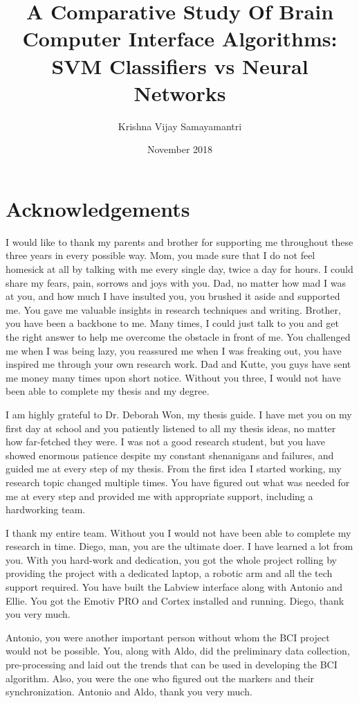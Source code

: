 \documentclass{article}
\title{A Comparative Study Of Brain Computer Interface Algorithms: SVM Classifiers vs Neural Networks}
\author{Krishna Vijay Samayamantri}
\date{November 2018}
\begin{document}
\maketitle

\section{Acknowledgements}
I would like to thank my parents and brother for supporting me throughout these three years in every possible way. Mom, you made sure that I do not feel homesick at all by talking with me every single day, twice a day for hours. I could share my fears, pain, sorrows and joys with you. Dad, no matter how mad I was at you, and how much I have insulted you, you brushed it aside and supported me. You gave me valuable insights in research techniques and writing. Brother, you have been a backbone to me. Many times, I could just talk to you and get the right answer to help me overcome the obstacle in front of me. You challenged me when I was being lazy, you reassured me when I was freaking out, you have inspired me through your own research work. Dad and Kutte, you guys have sent me money many times upon short notice. Without you three, I would not have been able to complete my thesis and my degree.

I am highly grateful to Dr. Deborah Won, my thesis guide. I have met you on my first day at school and you patiently listened to all my thesis ideas, no matter how far-fetched they were. I was not a good research student, but you have showed enormous patience despite my constant shenanigans and failures, and guided me at every step of my thesis. From the first idea I started working, my research topic changed multiple times. You have figured out what was needed for me at every step and provided me with appropriate support, including a hardworking team.

I thank my entire team. Without you I would not have been able to complete my research in time. Diego, man, you are the ultimate doer. I have learned a lot from you. With you hard-work and dedication, you got the whole project rolling by providing the project with a dedicated laptop, a robotic arm and all the tech support required. You have built the Labview interface along with Antonio and Ellie. You got the Emotiv PRO and Cortex installed and running. Diego, thank you very much. 

Antonio, you were another important person without whom the BCI project would not be possible. You, along with Aldo, did the preliminary data collection, pre-processing and laid out the trends that can be used in developing the BCI algorithm. Also, you were the one who figured out the markers and their synchronization. Antonio and Aldo, thank you very much. 
\end{document}

